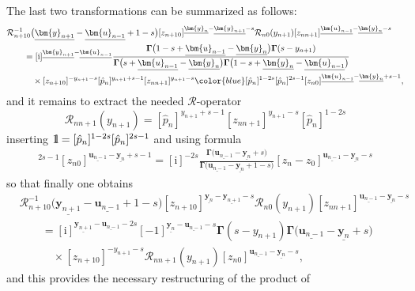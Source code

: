 \documentclass[10pt,a4paper]{amsart}
\newcommand{\blue}{\color{blue}}
\renewcommand{\imath}{\mathrm{i}}
\newcommand{\II}{\hbox{{1}\kern-.25em\hbox{l}}}
\numberwithin{equation}{section}
\begin{document}
The last two transformations can be summarized as follows:
\begin{align*}
&
\mathcal{R}^{-1}_{n+1 0}
\bigl(\underline{\bm{y}_{n+1}}-\underline{\bm{u}_{n-1}}+1-s\bigr)
[z_{n+1 0}]^{\underline{\bm{y}_{n}}-\underline{\bm{y}_{n+1}}-s}
\mathcal{R}_{n 0}(y_{n+1})
[z_{n n+1}]^{\underline{\bm{u}_{n-1}}-\underline{\bm{y}_{n}}-s} \\
& \qquad =
[\imath]^{\underline{\bm{y}_{n+1}}-
\underline{\bm{u}_{n-1}}}
\frac{\mathbf{\Gamma}\bigl(1-s+\underline{\bm{u}_{n-1}}-
\underline{\bm{y}_{n}}\bigr) \mathbf{\Gamma}(s-y_{n+1})}
{\mathbf{\Gamma}\bigl(s+\underline{\bm{u}_{n-1}}-
\underline{\bm{y}_{n}}\bigr)\mathbf{\Gamma}\bigl(1-s+\underline{\bm{y}_{n}}-
\underline{\bm{u}_{n-1}}\bigr)} \\
& \qquad\quad \times
[z_{n+1 0}]^{-y_{n+1}-s}
[\hat{p}_n]^{y_{n+1}+s-1} [z_{n n+1}]^{y_{n+1}-s}
{\blue [\hat{p}_n]^{1-2s} [\hat{p}_n]^{2s-1}}
[z_{n 0}]^{\underline{\bm{u}_{n-1}}-
\underline{\bm{y}_{n}}+s-1} ,
\end{align*}
and it remains to extract the needed $\mathcal{R}$-operator
\[
\mathcal{R}_{n n+1}(y_{n+1}) = [\hat{p}_n]^{y_{n+1}+s-1}
[z_{n n+1}]^{y_{n+1}-s} [\hat{p}_n]^{1-2s}
\]
inserting $\II = [\hat{p}_n]^{1-2s} [\hat{p}_n]^{2s-1}$ and using formula
\begin{align*}
[\hat{p}_n]^{2s-1}
[z_{n 0}]^{\underline{\bm{u}_{n-1}}-
\underline{\bm{y}_{n}}+s-1} =
[\imath]^{-2s}
\frac{\mathbf{\Gamma}\bigl(\underline{\bm{u}_{n-1}}-
\underline{\bm{y}_{n}}+s\bigr)}
{\mathbf{\Gamma}\bigl(\underline{\bm{u}_{n-1}}-
\underline{\bm{y}_{n}}+1-s\bigr)}
[z_n-z_0]^{\underline{\bm{u}_{n-1}}-
\underline{\bm{y}_{n}}-s}
\end{align*}
so that finally one obtains
\begin{align*}
&
\mathcal{R}^{-1}_{n+1 0}
\bigl(\underline{\bm{y}_{n+1}}-\underline{\bm{u}_{n-1}}+1-s\bigr)
[z_{n+1 0}]^{\underline{\bm{y}_{n}}-\underline{\bm{y}_{n+1}}-s}
\mathcal{R}_{n 0}(y_{n+1})
[z_{n n+1}]^{\underline{\bm{u}_{n-1}}-\underline{\bm{y}_{n}}-s} \\
& \qquad =
 [\imath]^{\underline{\bm{y}_{n+1}}-\underline{\bm{u}_{n-1}}-2s}
[-1]^{\underline{\bm{y}_{n}}-\underline{\bm{u}_{n-1}}-s}
\mathbf{\Gamma}(s-y_{n+1})
\mathbf{\Gamma}\bigl(\underline{\bm{u}_{n-1}}-\underline{\bm{y}_{n}}+s\bigr) \\
& \qquad\quad \times
[z_{n+1 0}]^{-y_{n+1}-s} \mathcal{R}_{n n+1}(y_{n+1})
[z_{n 0}]^{\underline{\bm{u}_{n-1}}-
\underline{\bm{y}_{n}}-s} ,
\end{align*}
and this provides the necessary restructuring of the product of
\end{document}
